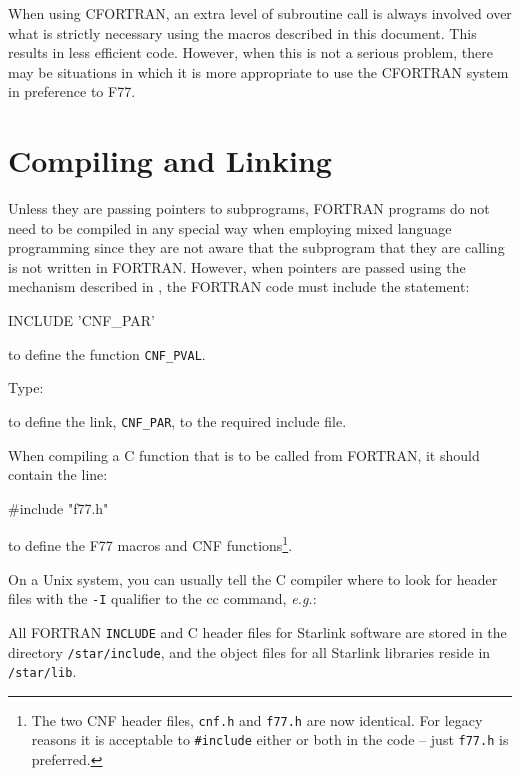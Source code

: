 \documentclass[twoside,11pt,nolof]{starlink}
\begin{document}
When using CFORTRAN, an extra level of subroutine call is always involved over
what is strictly necessary using the macros described in this document. This
results in less efficient code. However, when this is not a serious problem,
there may be situations in which it is more appropriate to use the CFORTRAN
system in preference to F77.

\section{Compiling and Linking\label{compiling_and_linking}}

Unless they are passing pointers to subprograms, FORTRAN programs do not need
to be compiled in any special way when employing mixed language programming
since they are not aware that the subprogram that they are calling is not
written in FORTRAN\@. However, when pointers are passed using the mechanism
described in
,
the FORTRAN code must include the statement:
\begin{terminalv}
INCLUDE 'CNF_PAR'
\end{terminalv}
to define the function \texttt{CNF\_PVAL}.

Type:
\begin{terminalv}
\end{terminalv}
to define the link, \texttt{CNF\_PAR}, to the required include file.

When compiling a C function that is
to be called from FORTRAN, it should contain the line:

\begin{terminalv}
#include "f77.h"
\end{terminalv}

to define the F77 macros and CNF functions\footnote{The two CNF header files,
\texttt{cnf.h} and \texttt{f77.h} are now identical. For legacy reasons
it is acceptable to \texttt{\#include} either or both in the code -- just
\texttt{f77.h} is preferred.}.

On a Unix system, you can usually tell the C compiler where to look for
header files with the \texttt{-I} qualifier to the cc command,
\textit{e.g.}:

\begin{terminalv}
\end{terminalv}

All FORTRAN \texttt{INCLUDE} and C header files for Starlink software are
stored in the directory \texttt{/star/include}, and the object files for all
Starlink libraries reside in \texttt{/star/lib}.
\end{document}
